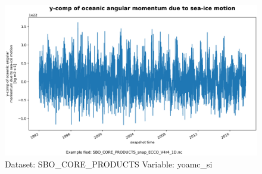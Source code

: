 \begin{figure}[H]
\centering
\includegraphics[scale=0.55]{../images/plots/oneD_plots/SBO_Core_Products/yoamc_si.png}
\caption{Dataset: SBO\_CORE\_PRODUCTS Variable: yoamc\_si}
\label{tab:table-SBO_CORE_PRODUCTS_yoamc_si-Plot}
\end{figure}
\pagebreak
